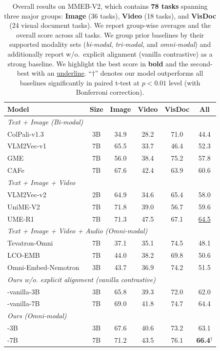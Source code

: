 \begin{table}[t]
\centering
\caption{Overall results on MMEB-V2, which contains \textbf{78 tasks} spanning three major groups: \textbf{Image} (36 tasks), \textbf{Video} (18 tasks), and \textbf{VisDoc} (24 visual document tasks). 
We report group-wise averages and the overall score across all tasks.
We group prior baselines by their supported modality sets (\textit{bi-modal}, \textit{tri-modal}, and \textit{omni-modal}) and additionally report \ours{} w/o.\ explicit alignment (vanilla contrastive) as a strong baseline.
We highlight the best score in \textbf{bold} and the second-best with an \underline{underline}.
``$\dag$'' denotes our model outperforms all baselines significantly in paired t-test at $p<0.01$ level (with Bonferroni correction).
}\label{tab:mmeb-v2-overall}
\begin{tabular}{l c cccc}
\toprule
Model & Size & Image & Video & VisDoc & All \\
\midrule
\multicolumn{6}{l}{\textit{Text + Image (Bi-modal)}} \\
ColPali-v1.3~\cite{ColPali}        & 3B & 34.9 & 28.2   & 71.0   & 44.4 \\
VLM2Vec-v1~\cite{MMEB}       & 7B   & 65.5 & 33.7 & 46.4 & 52.3 \\
GME~\cite{GME}            & 7B   & 56.0 &	38.4 & {75.2} & 57.8 \\
CAFe~\cite{CAFe}      & 7B & 67.6 & 42.4   & 63.9   & 60.6 \\
\midrule
\multicolumn{6}{l}{\textit{Text + Image + Video}} \\
VLM2Vec-v2~\cite{MMEB-v2}       & 2B  & 64.9	& 34.6	& 65.4	& 58.0 \\
UniME-V2~\cite{UniME-V2}             & 7B  & {71.8}	& 39.0	& 56.7	& 59.6 \\
UME-R1~\cite{UME-R1}                 & 7B  & 71.3	& {47.5}	& 67.1	& \underline{64.5} \\
\midrule
\multicolumn{6}{l}{\textit{Text + Image + Video + Audio (Omni-modal)}} \\
Tevatron-Omni~\cite{tevatron-omni}   & 7B  & 37.1	& 35.1	& 74.5	& 48.1 \\
LCO-EMB~\cite{LCO-Embed}   & 7B  & 44.0 & 	38.2	& 69.8	& 50.6 \\
Omni-Embed-Nemotron~\cite{Nemotron}  & 3B  & 43.7	& 36.9	& 74.2	& 51.5 \\
\midrule
\multicolumn{6}{l}{\textit{Ours w/o. explicit alignment (vanilla contrastive)}} \\
\ours{}-vanilla-3B & 3B & 65.8 & 39.3 & 72.0 & 62.0 \\
\ours{}-vanilla-7B & 7B & 69.0 & 41.8 & 74.7 & 64.4 \\
\midrule
\multicolumn{6}{l}{\textit{Ours (Omni-modal)}} \\
\ours{}-3B & 3B & 67.6 & 40.6 & 73.2 & 63.1 \\
\ours{}-7B & 7B & 71.2 & 43.5 & 76.1 & \textbf{66.4}$^\dag$ \\
\bottomrule
\end{tabular}
\vspace{-0.12cm}
\end{table}


